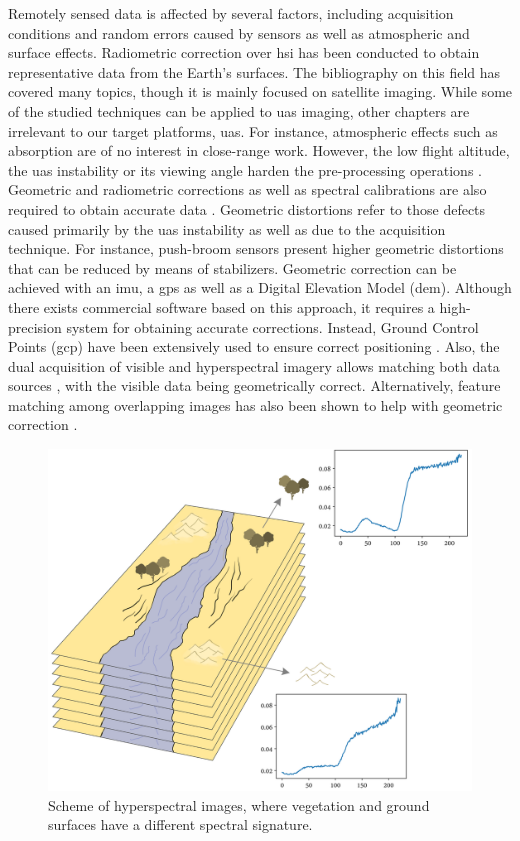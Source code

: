 Remotely sensed data is affected by several factors, including acquisition conditions and random errors caused by sensors as well as atmospheric and surface effects. Radiometric correction over \acrshort{hsi} has been conducted to obtain representative data from the Earth's surfaces. The bibliography on this field has covered many topics, though it is mainly focused on satellite imaging. While some of the studied techniques can be applied to \acrshort{uas} imaging, other chapters are irrelevant to our target platforms, \acrshort{uas}. For instance, atmospheric effects such as absorption are of no interest in close-range work. However, the low flight altitude, the \acrshort{uas} instability or its viewing angle harden the pre-processing operations \cite{jakob_need_2017}. Geometric and radiometric corrections as well as spectral calibrations are also required to obtain accurate data \cite{adao_hyperspectral_2017}. Geometric distortions refer to those defects caused primarily by the \acrshort{uas} instability as well as due to the acquisition technique. For instance, push-broom sensors present higher geometric distortions that can be reduced by means of stabilizers. Geometric correction can be achieved with an \acrshort{imu}, a \acrshort{gps} as well as a Digital Elevation Model (\acrshort{dem}). Although there exists commercial software based on this approach, it requires a high-precision system for obtaining accurate corrections. Instead, Ground Control Points (\acrshort{gcp}) have been extensively used to ensure correct positioning \cite{ramirez-paredes_low-altitude_2016}. Also, the dual acquisition of visible and hyperspectral imagery allows matching both data sources \cite{jurado_efficient_2021, xue_compact_2021, ramirez-paredes_low-altitude_2016}, with the visible data being geometrically correct. Alternatively, feature matching among overlapping images has also been shown to help with geometric correction \cite{akhoundi_khezrabad_new_2022}.

\begin{figure}[ht]
	\includegraphics[width=.9\textwidth]{figs/fundamentals/material_hyperspectral.png}
	\caption{Scheme of hyperspectral images, where vegetation and ground surfaces have a different spectral signature.  }
    \label{fig:fundamentals_material_hyperspectral}
\end{figure}

